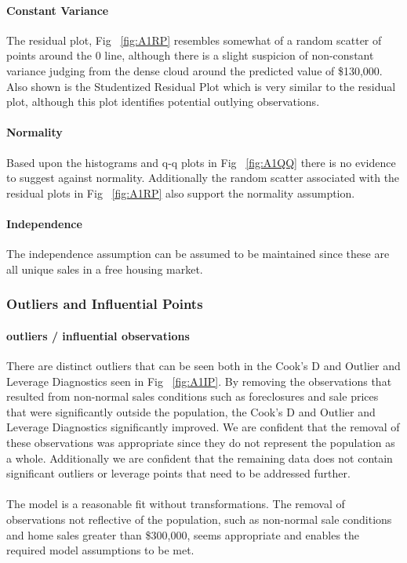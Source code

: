 \documentclass[11pt]{scrartcl} %
\begin{document}
\paragraph{Constant Variance} The residual plot, Fig ~\ref{fig:A1RP} resembles somewhat of a random scatter of points around the 0 line, although there is a slight suspicion of non-constant variance judging from the dense cloud around the predicted value of \$130,000. Also shown is the Studentized Residual Plot which is very similar to the residual plot, although this plot identifies potential outlying observations.
\paragraph{Normality} Based upon the histograms and q-q plots in Fig ~\ref{fig:A1QQ} there is no evidence to suggest against normality. Additionally the random scatter associated with the residual plots in Fig ~\ref{fig:A1RP} also support the normality assumption.
\paragraph{Independence} The independence assumption can be assumed to be maintained since these are all unique sales in a free housing market. 
\subsubsection{Outliers and Influential Points}
\paragraph{outliers / influential observations} There are distinct outliers that can be seen both in the Cook's D and Outlier and Leverage Diagnostics seen in Fig ~\ref{fig:A1IP}. By removing the observations that resulted from non-normal sales conditions such as foreclosures and sale prices that were significantly outside the population, the Cook's D and Outlier and Leverage Diagnostics significantly improved. We are confident that the removal of these observations was appropriate since they do not represent the population as a whole. Additionally we are confident that the remaining data does not contain significant outliers or leverage points that need to be addressed further.
\paragraph{}The model is a reasonable fit without transformations.  The removal of observations not reflective of the population, such as non-normal sale conditions and home sales greater than \$300,000, seems appropriate and enables the required model assumptions to be met.
\end{document}
